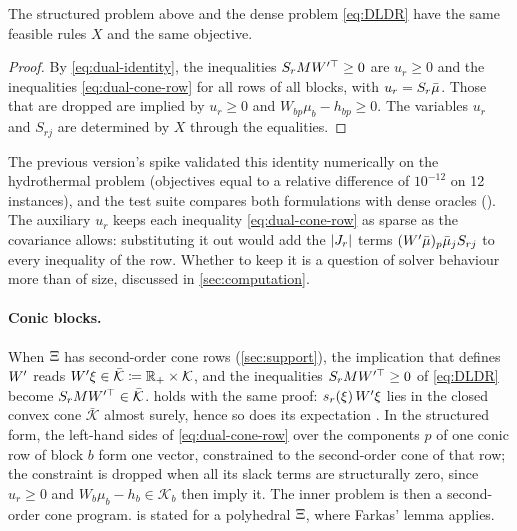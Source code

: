 \begin{proposition}
\label{prop:structured-dual}
The structured problem above and the dense problem \eqref{eq:DLDR} have the same feasible rules $X$ and the same objective.
\end{proposition}

\begin{proof}
By \eqref{eq:dual-identity}, the inequalities $S_rMW'^\top \ge 0$ are $u_r \ge 0$ and the inequalities \eqref{eq:dual-cone-row} for all rows of all blocks, with $u_r = S_r\bar\mu$.
Those that are dropped are implied by $u_r \ge 0$ and $W_{bp}\mu_b - h_{bp} \ge 0$.
The variables $u_r$ and $S_{rj}$ are determined by $X$ through the equalities.
\end{proof}

The previous version's spike validated this identity numerically on the hydrothermal problem
(objectives equal to a relative difference of $10^{-12}$ on 12 instances),
and the test suite compares both formulations with dense oracles ().
The auxiliary $u_r$ keeps each inequality \eqref{eq:dual-cone-row} as sparse as the covariance allows:
substituting it out would add the $\lvert J_r \rvert$ terms $(W'\bar\mu)_p\bar\mu_j S_{rj}$ to every inequality of the row.
Whether to keep it is a question of solver behaviour more than of size, discussed in \cref{sec:computation}.

\paragraph{Conic blocks.}
When $\Xi$ has second-order cone rows (\cref{sec:support}), the implication that defines $W'$ reads $W'\xi \in \bar{\mathcal{K}} \coloneqq \mathbb{R}_+ \times \mathcal{K}$,
and the inequalities $S_rMW'^\top \ge 0$ of \eqref{eq:DLDR} become $S_rMW'^\top \in \bar{\mathcal{K}}$.
 holds with the same proof:
$s_r(\xi)\,W'\xi$ lies in the closed convex cone $\bar{\mathcal{K}}$ almost surely, hence so does its expectation \citep[Theorem~2.1]{GWK2015}.
In the structured form, the left-hand sides of \eqref{eq:dual-cone-row} over the components $p$ of one conic row of block $b$ form one vector,
constrained to the second-order cone of that row;
the constraint is dropped when all its slack terms are structurally zero, since $u_r \ge 0$ and $W_b\mu_b - h_b \in \mathcal{K}_b$ then imply it.
The inner problem is then a second-order cone program.
 is stated for a polyhedral $\Xi$, where Farkas' lemma applies.

